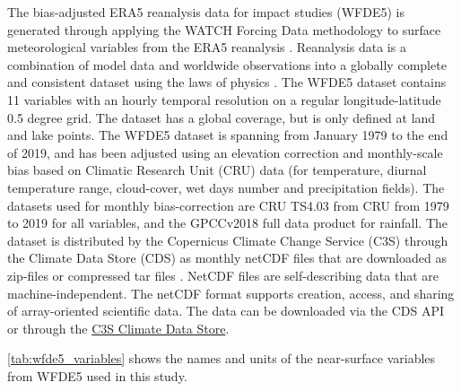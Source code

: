 The bias-adjusted ERA5 reanalysis data for impact studies (WFDE5) is generated through applying the WATCH Forcing Data methodology to surface meteorological variables from the ERA5 reanalysis \parencite{cucchi_wfde5_2020}. Reanalysis data is a combination of model data and worldwide observations into a globally complete and consistent dataset using the laws of physics \parencite{hersbach18}. The WFDE5 dataset contains 11 variables with an hourly temporal resolution on a regular longitude-latitude 0.5 degree grid. The dataset has a global coverage, but is only defined at land and lake points. The WFDE5 dataset is spanning from January 1979 to the end of 2019, and has been adjusted using an elevation correction and monthly-scale bias based on Climatic Research Unit (CRU) data (for temperature, diurnal temperature range, cloud-cover, wet days number and precipitation fields). The datasets used for monthly bias-correction are CRU TS4.03 from CRU \parencite{harris2020version} from 1979 to 2019 for all variables, and the GPCCv2018 full data product \parencite{schneider2018gpcc} for rainfall. The dataset is distributed by the Copernicus Climate Change Service (C3S) through the Climate Data Store (CDS) as monthly netCDF files that are downloaded as zip-files or compressed tar files \parencite{copernicus_climate_change_service_near_2020}. NetCDF files are self-describing data that are machine-independent. The netCDF format supports creation, access, and sharing of array-oriented scientific data. The data can be downloaded via the CDS API or through the \href{https://cds.climate.copernicus.eu/cdsapp#!/dataset/reanalysis-era5-single-levels?tab=overview}{C3S Climate Data Store}.

\autoref{tab:wfde5_variables} shows the names and units of the near-surface variables from WFDE5 used in this study. 


